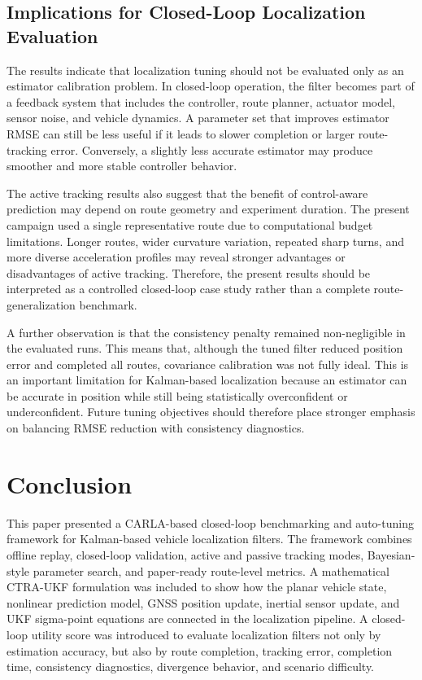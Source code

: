 \documentclass[conference]{IEEEtran}
\begin{document}
\subsection{Implications for Closed-Loop Localization Evaluation}

The results indicate that localization tuning should not be evaluated only as an estimator calibration problem. In closed-loop operation, the filter becomes part of a feedback system that includes the controller, route planner, actuator model, sensor noise, and vehicle dynamics. A parameter set that improves estimator RMSE can still be less useful if it leads to slower completion or larger route-tracking error. Conversely, a slightly less accurate estimator may produce smoother and more stable controller behavior.

The active tracking results also suggest that the benefit of control-aware prediction may depend on route geometry and experiment duration. The present campaign used a single representative route due to computational budget limitations. Longer routes, wider curvature variation, repeated sharp turns, and more diverse acceleration profiles may reveal stronger advantages or disadvantages of active tracking. Therefore, the present results should be interpreted as a controlled closed-loop case study rather than a complete route-generalization benchmark.

A further observation is that the consistency penalty remained non-negligible in the evaluated runs. This means that, although the tuned filter reduced position error and completed all routes, covariance calibration was not fully ideal. This is an important limitation for Kalman-based localization because an estimator can be accurate in position while still being statistically overconfident or underconfident. Future tuning objectives should therefore place stronger emphasis on balancing RMSE reduction with consistency diagnostics.

\section{Conclusion}
\label{sec:conclusion}

This paper presented a CARLA-based closed-loop benchmarking and auto-tuning framework for Kalman-based vehicle localization filters. The framework combines offline replay, closed-loop validation, active and passive tracking modes, Bayesian-style parameter search, and paper-ready route-level metrics. A mathematical CTRA-UKF formulation was included to show how the planar vehicle state, nonlinear prediction model, GNSS position update, inertial sensor update, and UKF sigma-point equations are connected in the localization pipeline. A closed-loop utility score was introduced to evaluate localization filters not only by estimation accuracy, but also by route completion, tracking error, completion time, consistency diagnostics, divergence behavior, and scenario difficulty.
\end{document}
